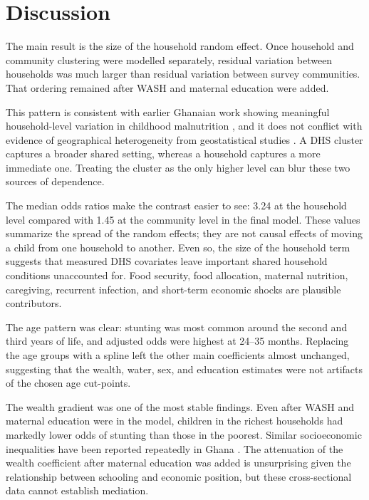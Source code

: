 \documentclass[11pt]{article}
\begin{document}
\section{Discussion}

The main result is the size of the household random effect. Once household and community clustering were modelled separately, residual variation between households was much larger than residual variation between survey communities. That ordering remained after WASH and maternal education were added.

This pattern is consistent with earlier Ghanaian work showing meaningful household-level variation in childhood malnutrition \citep{AhetoEtAl2015}, and it does not conflict with evidence of geographical heterogeneity from geostatistical studies \citep{AhetoDagne2021,AmoakoJohnson2022}. A DHS cluster captures a broader shared setting, whereas a household captures a more immediate one. Treating the cluster as the only higher level can blur these two sources of dependence.

The median odds ratios make the contrast easier to see: 3.24 at the household level compared with 1.45 at the community level in the final model. These values summarize the spread of the random effects; they are not causal effects of moving a child from one household to another. Even so, the size of the household term suggests that measured DHS covariates leave important shared household conditions unaccounted for. Food security, food allocation, maternal nutrition, caregiving, recurrent infection, and short-term economic shocks are plausible contributors.

The age pattern was clear: stunting was most common around the second and third years of life, and adjusted odds were highest at 24--35 months. Replacing the age groups with a spline left the other main coefficients almost unchanged, suggesting that the wealth, water, sex, and education estimates were not artifacts of the chosen age cut-points.

The wealth gradient was one of the most stable findings. Even after WASH and maternal education were in the model, children in the richest households had markedly lower odds of stunting than those in the poorest. Similar socioeconomic inequalities have been reported repeatedly in Ghana \citep{SeworJayalakshmi2024,OsborneEtAl2025}. The attenuation of the wealth coefficient after maternal education was added is unsurprising given the relationship between schooling and economic position, but these cross-sectional data cannot establish mediation.
\end{document}
